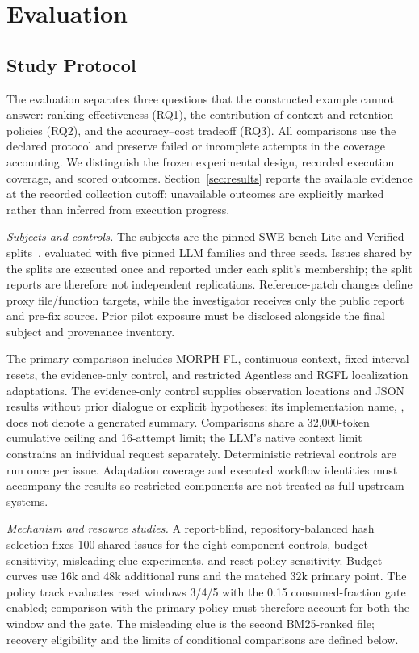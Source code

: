 \documentclass[letterpaper,journal]{IEEEtran}
\newcommand{\tool}{MORPH-FL}
\newcommand{\code}[1]{\texttt{\detokenize{#1}}}
\begin{document}
\section{Evaluation}\label{sec:study}
\subsection{Study Protocol}
The evaluation separates three questions that the constructed example cannot answer: ranking effectiveness (RQ1), the contribution of context and retention policies (RQ2), and the accuracy--cost tradeoff (RQ3). All comparisons use the declared protocol and preserve failed or incomplete attempts in the coverage accounting. We distinguish the frozen experimental design, recorded execution coverage, and scored outcomes. Section~\ref{sec:results} reports the available evidence at the recorded collection cutoff; unavailable outcomes are explicitly marked rather than inferred from execution progress.

\emph{Subjects and controls.} The subjects are the pinned SWE-bench Lite and Verified splits~\cite{swebench2024}, evaluated with five pinned LLM families and three seeds. Issues shared by the splits are executed once and reported under each split's membership; the split reports are therefore not independent replications. Reference-patch changes define proxy file/function targets, while the investigator receives only the public report and pre-fix source. Prior pilot exposure must be disclosed alongside the final subject and provenance inventory.

The primary comparison includes \tool{}, continuous context, fixed-interval resets, the evidence-only control, and restricted Agentless and RGFL localization adaptations. The evidence-only control supplies observation locations and JSON results without prior dialogue or explicit hypotheses; its implementation name, \code{stateless_summary}, does not denote a generated summary. Comparisons share a 32,000-token cumulative ceiling and 16-attempt limit; the LLM's native context limit constrains an individual request separately. Deterministic retrieval controls are run once per issue. Adaptation coverage and executed workflow identities must accompany the results so restricted components are not treated as full upstream systems.

\emph{Mechanism and resource studies.} A report-blind, repository-balanced hash selection fixes 100 shared issues for the eight component controls, budget sensitivity, misleading-clue experiments, and reset-policy sensitivity. Budget curves use 16k and 48k additional runs and the matched 32k primary point. The policy track evaluates reset windows 3/4/5 with the 0.15 consumed-fraction gate enabled; comparison with the primary policy must therefore account for both the window and the gate. The misleading clue is the second BM25-ranked file; recovery eligibility and the limits of conditional comparisons are defined below.
\end{document}
